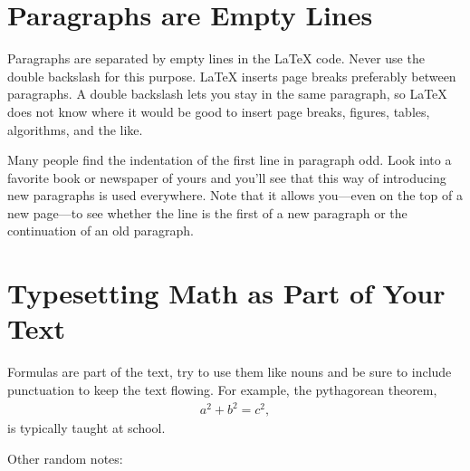 \documentclass[../{{cookiecutter.project_slug}}.tex]{subfiles}
\begin{document}
    \section{Paragraphs are Empty Lines}
    \label{sec:paras}

    Paragraphs are separated  by empty lines in the  \LaTeX{} code.  Never 
    use  the double  backslash for  this purpose.   \LaTeX{} inserts  page 
    breaks  preferably between  paragraphs.  A  double backslash  lets you 
    stay in the  same paragraph, so \LaTeX{} does not  know where it would 
    be good  to insert page  breaks, figures, tables, algorithms,  and the 
    like.                                                                  

    Many  people find  the  indentation  of the  first  line in  paragraph 
    odd.  Look into  a favorite book or newspaper of  yours and you'll see 
    that this way of introducing  new paragraphs is used everywhere.  Note 
    that it  allows you---even on the  top of a new  page---to see whether 
    the line is the first of a new paragraph or the continuation of an old 
    paragraph.                                                             

    \section{Typesetting Math as Part of Your Text}

    Formulas are part of the text, try  to use them like nouns and be sure 
    to include  punctuation to  keep the text  flowing.  For  example, the 
    pythagorean theorem,                                                   
    \begin{align}
        a^2 + b^2 = c^2,
    \end{align}
    is typically taught at school.

    Other random notes:
\end{document}

